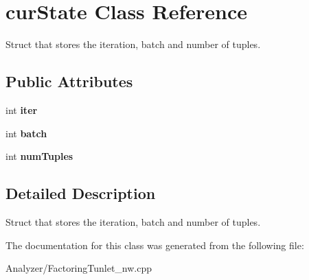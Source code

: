 \hypertarget{structcur_state}{\section{cur\-State Class Reference}
\label{structcur_state}
}


Struct that stores the iteration, batch and number of tuples.  


\subsection*{Public Attributes}
\begin{DoxyCompactItemize}
\item 
\hypertarget{structcur_state_a52f0ae3f978cdf1eb66ef02d1b223e62}{int {\bfseries iter}}\label{structcur_state_a52f0ae3f978cdf1eb66ef02d1b223e62}

\item 
\hypertarget{structcur_state_a9fbda04627b62cc569eb75980d1afecc}{int {\bfseries batch}}\label{structcur_state_a9fbda04627b62cc569eb75980d1afecc}

\item 
\hypertarget{structcur_state_a75c3cd911a5d911cf0c540afe4c406fe}{int {\bfseries num\-Tuples}}\label{structcur_state_a75c3cd911a5d911cf0c540afe4c406fe}

\end{DoxyCompactItemize}


\subsection{Detailed Description}
Struct that stores the iteration, batch and number of tuples. 

The documentation for this class was generated from the following file\-:\begin{DoxyCompactItemize}
\item 
Analyzer/Factoring\-Tunlet\-\_\-nw.\-cpp\end{DoxyCompactItemize}
